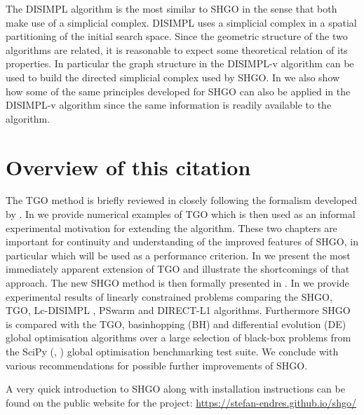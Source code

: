 The DISIMPL algorithm is the most similar to SHGO in the sense that both make use of a simplicial complex. DISIMPL uses a simplicial complex in a  spatial partitioning of the initial search space. Since the geometric structure of the two algorithms are related, it is reasonable to expect some theoretical relation of its properties. In particular the graph structure in the DISIMPL-v algorithm \cite{Paul2016} can be used to build the directed simplicial complex used by SHGO. In  we also show how some of the same principles developed for SHGO can also be applied in the DISIMPL-v algorithm since the same information is readily available to the algorithm.
 
\section{Overview of this citation}
The TGO method is briefly reviewed in  closely following the formalism developed by \citet{Henderson2015}. In  we provide numerical examples of TGO which is then used as an informal experimental motivation for extending the algorithm. These two chapters are important for continuity and understanding of the improved features of SHGO, in particular  which will be used as a performance criterion. In  we present the most immediately apparent extension of TGO and illustrate the shortcomings of that approach. The new SHGO method is then formally presented in . In  we provide experimental results of linearly constrained problems comparing the SHGO, TGO, Lc-DISIMPL \cite{Paul2016}, PSwarm \cite{Vaz2008} and DIRECT-L1 \cite{finkel2003direct} algorithms. Furthermore SHGO is compared with the TGO, basinhopping (BH) and differential evolution (DE) global optimisation algorithms over a large selection of black-box problems from the SciPy (\citeauthor*{scipy}, \citeyear{scipy}) global optimisation benchmarking test suite. We conclude with various recommendations for possible further improvements of SHGO.

A very quick introduction to SHGO along with installation instructions can be found on the public website for the project: \href{https://stefan-endres.github.io/shgo/}{https://stefan-endres.github.io/shgo/}